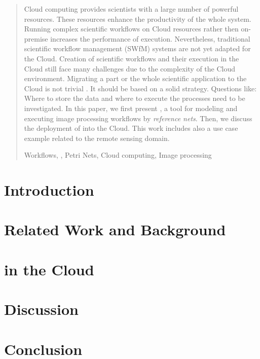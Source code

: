 \documentclass[runningheads,a4paper]{llncs}
\newcommand{\keywords}[1]{\par\addvspace\baselineskip
\noindent\keywordname\enspace\ignorespaces#1}
\begin{document}
\begin{abstract}
Cloud computing provides scientists with a large number of powerful resources.
%
These resources enhance the productivity of the whole system.
%
Running complex scientific workflows on Cloud resources rather then on-premise increases the performance of execution.
%
Nevertheless, traditional scientific workflow management (SWfM) systems are not yet adapted for the Cloud.
%
Creation of scientific workflows and their execution in the Cloud still face many challenges due to the complexity of the Cloud environment. 
%
Migrating a part or the whole scientific application to the Cloud is not trivial .
%
It should be based on a solid strategy.
%
Questions like: Where to store the data and where to execute the processes need to be investigated.
%
In this paper, we first present \RenewGrass{}, a tool for modeling and executing image processing workflows by \emph{reference nets}.
%
Then, we discuss the deployment of \RenewGrass{} into the Cloud.
%
This work includes also a use case example related to the remote sensing domain.
%


\keywords{Workflows, \RenewGrass, Petri Nets, Cloud computing, Image processing}
\end{abstract}


\section{Introduction}


\section{Related Work and Background}


\section{\RenewGrass{}}


\section{\RenewGrass{} in the Cloud}



\section{Discussion}


\section{Conclusion}








\end{document}
